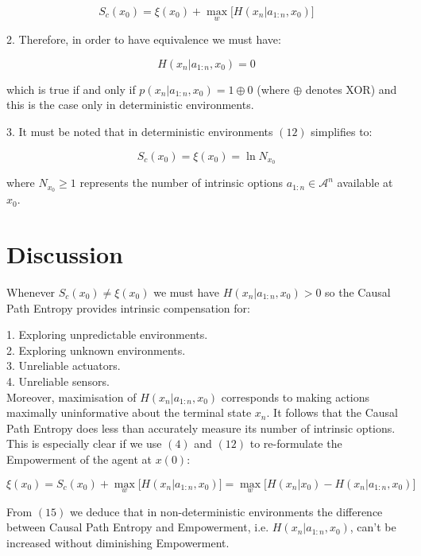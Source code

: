 \documentclass{article}
\begin{document}
\begin{equation}
S_c(x_0) = \xi(x_0)  + \max\limits_{w} \big[H(x_n|a_{1:n},x_0)\big]
\end{equation}

2. Therefore, in order to have equivalence we must have:

\begin{equation}
H(x_n|a_{1:n},x_0) = 0
\end{equation}

which is true if and only if $p(x_n|a_{1:n},x_0) = 1 \oplus 0$ (where $\oplus$ denotes XOR) and this is the case only in deterministic environments. 

3. It must be noted that in deterministic environments $(12)$ simplifies to:

\begin{equation}
S_c(x_0) = \xi(x_0)  = \ln N_{x_0}
\end{equation}

where $N_{x_0} \geq 1$ represents the number of intrinsic options $a_{1:n} \in \mathcal{A}^n$ available at $x_0$. 

\section{Discussion}

Whenever $S_c(x_0) \neq \xi(x_0)$ we must have $H(x_n|a_{1:n},x_0) > 0$ so the Causal Path Entropy provides intrinsic compensation for:

1. Exploring unpredictable environments. \\
2. Exploring unknown environments. \\
3. Unreliable actuators. \\
4. Unreliable sensors. \\

Moreover, maximisation of $H(x_n|a_{1:n},x_0)$ corresponds to making actions maximally uninformative about the terminal state $x_n$. It follows that the Causal Path Entropy does less than accurately measure its number of intrinsic options. This is especially clear if we use $(4)$ and $(12)$ to re-formulate the Empowerment of the agent at $x(0)$:

\begin{equation}
\xi(x_0) = S_c(x_0)  + \max\limits_{w} \big[H(x_n|a_{1:n},x_0)\big] =  \max\limits_{w} \big[H(x_n|x_0) -H(x_n|a_{1:n},x_0)\big]
\end{equation}

From $(15)$ we deduce that in non-deterministic environments the difference between Causal Path Entropy and Empowerment, i.e. $H(x_n|a_{1:n},x_0)$, can't be increased without diminishing Empowerment. 
\end{document}
